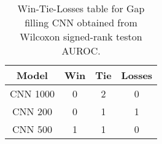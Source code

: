 \begin{table}[H]
\centering
\begin{tabular}{|c|c|c|c|}

\textbf{Model} &  \textbf{Win} &  \textbf{Tie} &  \textbf{Losses} \\
\hline

      CNN 1000 &             0 &             2 &                0 \\
\hline
       CNN 200 &             0 &             1 &                1 \\
\hline
       CNN 500 &             1 &             1 &                0 \\
\hline

\end{tabular}
\caption{Win-Tie-Losses table for Gap filling CNN obtained from Wilcoxon signed-rank teston AUROC.}
\label{tab:gap_filling_cnn_model_comparison}
\end{table}